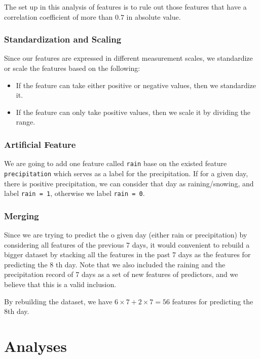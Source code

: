 \documentclass[a4paper,11pt]{article}
\newcommand{\pcode}[1]{\texttt{#1}}
\begin{document}
The set up in this analysis of features is to rule out those features that have a correlation coefficient of more than $0.7$ in absolute value.\par


\subsubsection{Standardization and Scaling}
Since our features are expressed in different measurement scales, we standardize or scale the features based on the following:
\begin{itemize}
\item If the feature can take either positive or negative values, then we standardize it.
\item If the feature can only take positive values, then we scale it by dividing the range.
\end{itemize}

\subsubsection{Artificial Feature}

We are going to add one feature called \pcode{rain} base on the existed feature \pcode{precipitation} which serves as a label for the precipitation. If for a given day, there is positive precipitation, we can consider that day as raining/snowing, and label \pcode{rain = 1}, otherwise we label \pcode{rain = 0}.

\subsubsection{Merging}
Since we are trying to predict the o given day (either rain or precipitation) by considering all features of the previous 7 days, it would convenient to rebuild a bigger dataset by  stacking all the features in the past 7 days as the features for predicting the 8 th day. Note that we also included the raining and the precipitation record of 7 days as a set of new features of predictors, and we believe that this is a valid inclusion.\par

By rebuilding the dataset, we have $6\times 7 + 2 \times 7 = 56$ features for predicting the 8th day.


\newpage

\section{Analyses}
\end{document}
